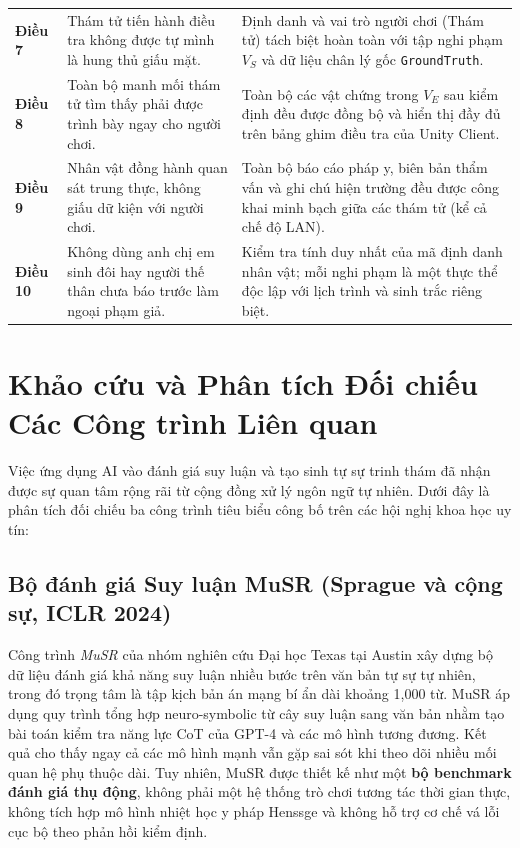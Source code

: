 \begin{table}[H]
\begin{tabularx}{\textwidth}{p{1.4cm} p{5.6cm} X}
\textbf{Điều 7} & Thám tử tiến hành điều tra không được tự mình là hung thủ giấu mặt. & Định danh và vai trò người chơi (Thám tử) tách biệt hoàn toàn với tập nghi phạm $V_S$ và dữ liệu chân lý gốc \texttt{GroundTruth}. \\
\textbf{Điều 8} & Toàn bộ manh mối thám tử tìm thấy phải được trình bày ngay cho người chơi. & Toàn bộ các vật chứng trong $V_E$ sau kiểm định đều được đồng bộ và hiển thị đầy đủ trên bảng ghim điều tra của Unity Client. \\
\textbf{Điều 9} & Nhân vật đồng hành quan sát trung thực, không giấu dữ kiện với người chơi. & Toàn bộ báo cáo pháp y, biên bản thẩm vấn và ghi chú hiện trường đều được công khai minh bạch giữa các thám tử (kể cả chế độ LAN). \\
\textbf{Điều 10} & Không dùng anh chị em sinh đôi hay người thế thân chưa báo trước làm ngoại phạm giả. & Kiểm tra tính duy nhất của mã định danh nhân vật; mỗi nghi phạm là một thực thể độc lập với lịch trình và sinh trắc riêng biệt. \\
\bottomrule
\end{tabularx}
\end{table}

\section{Khảo cứu và Phân tích Đối chiếu Các Công trình Liên quan}
\label{sec:theory_related_works}

Việc ứng dụng AI vào đánh giá suy luận và tạo sinh tự sự trinh thám đã nhận được sự quan tâm rộng rãi từ cộng đồng xử lý ngôn ngữ tự nhiên. Dưới đây là phân tích đối chiếu ba công trình tiêu biểu công bố trên các hội nghị khoa học uy tín:

\subsection{Bộ đánh giá Suy luận MuSR (Sprague và cộng sự, ICLR 2024)}
Công trình \textit{MuSR} của nhóm nghiên cứu Đại học Texas tại Austin \cite{sprague2024musr} xây dựng bộ dữ liệu đánh giá khả năng suy luận nhiều bước trên văn bản tự sự tự nhiên, trong đó trọng tâm là tập kịch bản án mạng bí ẩn dài khoảng 1,000 từ. MuSR áp dụng quy trình tổng hợp neuro-symbolic từ cây suy luận sang văn bản nhằm tạo bài toán kiểm tra năng lực CoT của GPT-4 và các mô hình tương đương. Kết quả cho thấy ngay cả các mô hình mạnh vẫn gặp sai sót khi theo dõi nhiều mối quan hệ phụ thuộc dài. Tuy nhiên, MuSR được thiết kế như một \textbf{bộ benchmark đánh giá thụ động}, không phải một hệ thống trò chơi tương tác thời gian thực, không tích hợp mô hình nhiệt học y pháp Henssge và không hỗ trợ cơ chế vá lỗi cục bộ theo phản hồi kiểm định.

